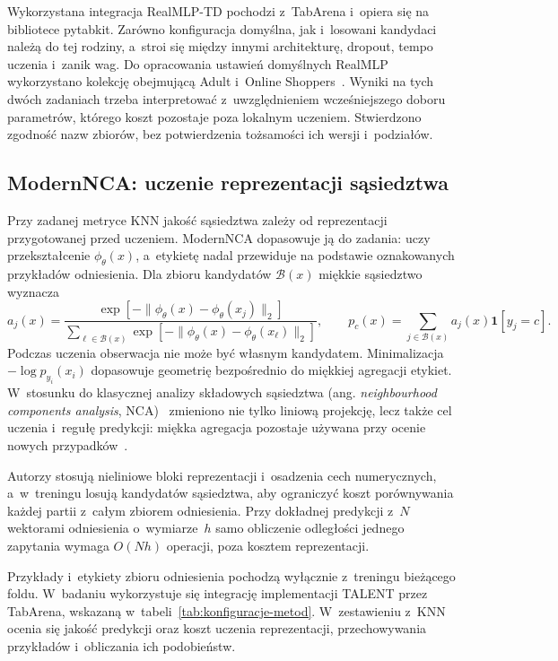 Wykorzystana integracja RealMLP-TD pochodzi z~TabArena i~opiera się na bibliotece pytabkit. Zarówno konfiguracja domyślna, jak i~losowani kandydaci należą do tej rodziny, a~stroi się między innymi architekturę, dropout, tempo uczenia i~zanik wag. Do opracowania ustawień domyślnych RealMLP wykorzystano kolekcję obejmującą Adult i~Online Shoppers~\cite{holzmueller2024realmlp}. Wyniki na tych dwóch zadaniach trzeba interpretować z~uwzględnieniem wcześniejszego doboru parametrów, którego koszt pozostaje poza lokalnym uczeniem. Stwierdzono zgodność nazw zbiorów, bez potwierdzenia tożsamości ich wersji i~podziałów.

\subsection{ModernNCA: uczenie reprezentacji sąsiedztwa}
\label{sec:modernnca}

Przy zadanej metryce KNN jakość sąsiedztwa zależy od reprezentacji przygotowanej przed uczeniem. ModernNCA dopasowuje ją do zadania: uczy przekształcenie $\phi_\theta(x)$, a~etykietę nadal przewiduje na podstawie oznakowanych przykładów odniesienia. Dla zbioru kandydatów $\mathcal{B}(x)$ miękkie sąsiedztwo wyznacza
\begin{equation}
a_j(x)=\frac{\exp[-\|\phi_\theta(x)-\phi_\theta(x_j)\|_2]}
{\sum_{\ell\in\mathcal{B}(x)}\exp[-\|\phi_\theta(x)-\phi_\theta(x_\ell)\|_2]},
\qquad
p_c(x)=\sum_{j\in\mathcal{B}(x)}a_j(x)\mathbf{1}[y_j=c].
\label{eq:modernnca}
\end{equation}
Podczas uczenia obserwacja nie może być własnym kandydatem. Minimalizacja $-\log p_{y_i}(x_i)$ dopasowuje geometrię bezpośrednio do miękkiej agregacji etykiet. W~stosunku do klasycznej analizy składowych sąsiedztwa (ang. \textit{neighbourhood components analysis}, NCA)~\cite{goldberger2004nca} zmieniono nie tylko liniową projekcję, lecz także cel uczenia i~regułę predykcji: miękka agregacja pozostaje używana przy ocenie nowych przypadków~\cite{ye2025modernnca}.

Autorzy stosują nieliniowe bloki reprezentacji i~osadzenia cech numerycznych, a~w~treningu losują kandydatów sąsiedztwa, aby ograniczyć koszt porównywania każdej partii z~całym zbiorem odniesienia. Przy dokładnej predykcji z~$N$ wektorami odniesienia o~wymiarze~$h$ samo obliczenie odległości jednego zapytania wymaga $O(Nh)$ operacji, poza kosztem reprezentacji.

Przykłady i~etykiety zbioru odniesienia pochodzą wyłącznie z~treningu bieżącego foldu. W~badaniu wykorzystuje się integrację implementacji TALENT przez TabArena, wskazaną w~tabeli~\ref{tab:konfiguracje-metod}. W~zestawieniu z~KNN ocenia się jakość predykcji oraz koszt uczenia reprezentacji, przechowywania przykładów i~obliczania ich podobieństw.

